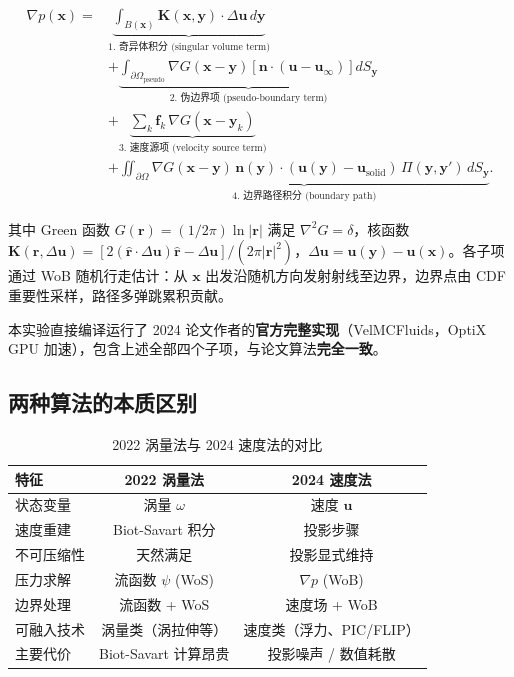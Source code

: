 \documentclass[12pt,a4paper]{article}
\begin{document}
\begin{align}
\nabla p(\boldsymbol{x}) = &\underbrace{\int_{B(\boldsymbol{x})} \boldsymbol{K}(\boldsymbol{x},\boldsymbol{y})\cdot\Delta\boldsymbol{u}\,d\boldsymbol{y}}_{\text{1. 奇异体积分 (singular volume term)}} \nonumber \\
&+ \underbrace{\int_{\partial\Omega_{\text{pseudo}}} \nabla G(\boldsymbol{x}-\boldsymbol{y})\left[\boldsymbol{n}\cdot(\boldsymbol{u}-\boldsymbol{u}_\infty)\right] dS_{\boldsymbol{y}}}_{\text{2. 伪边界项 (pseudo-boundary term)}} \nonumber \\
&+ \underbrace{\sum_k \boldsymbol{f}_k\,\nabla G(\boldsymbol{x}-\boldsymbol{y}_k)}_{\text{3. 速度源项 (velocity source term)}} \nonumber \\
&+ \underbrace{\iint_{\partial\Omega} \nabla G(\boldsymbol{x}-\boldsymbol{y})\, \boldsymbol{n}(\boldsymbol{y})\cdot(\boldsymbol{u}(\boldsymbol{y})-\boldsymbol{u}_{\text{solid}})\,\Pi(\boldsymbol{y},\boldsymbol{y}')\,dS_{\boldsymbol{y}}}_{\text{4. 边界路径积分 (boundary path)}}.
\label{eq:wob_terms}
\end{align}

其中 Green 函数 $G(\boldsymbol{r}) = (1/2\pi)\ln|\boldsymbol{r}|$ 满足 $\nabla^2 G = \delta$，核函数 $\boldsymbol{K}(\boldsymbol{r},\Delta\boldsymbol{u}) = [2(\hat{\boldsymbol{r}}\cdot\Delta\boldsymbol{u})\hat{\boldsymbol{r}} - \Delta\boldsymbol{u}]/(2\pi|\boldsymbol{r}|^2)$，$\Delta\boldsymbol{u} = \boldsymbol{u}(\boldsymbol{y})-\boldsymbol{u}(\boldsymbol{x})$。各子项通过 WoB 随机行走估计：从 $\boldsymbol{x}$ 出发沿随机方向发射射线至边界，边界点由 CDF 重要性采样，路径多弹跳累积贡献。

本实验直接编译运行了 2024 论文作者的\textbf{官方完整实现}（VelMCFluids，OptiX GPU 加速），包含上述全部四个子项，与论文算法\textbf{完全一致}。

\subsection{两种算法的本质区别}

\begin{table}[H]
    \centering
    \caption{2022 涡量法与 2024 速度法的对比}
    \label{tab:algorithm_diff}
    \begin{tabular}{lcc}
        \toprule
        \textbf{特征} & \textbf{2022 涡量法} & \textbf{2024 速度法} \\
        \midrule
        状态变量 & 涡量 $\omega$ & 速度 $\boldsymbol{u}$ \\
        速度重建 & Biot-Savart 积分 & 投影步骤 \\
        不可压缩性 & 天然满足 & 投影显式维持 \\
        压力求解 & 流函数 $\psi$ (WoS) & $\nabla p$ (WoB) \\
        边界处理 & 流函数 + WoS & 速度场 + WoB \\
        可融入技术 & 涡量类（涡拉伸等） & 速度类（浮力、PIC/FLIP） \\
        主要代价 & Biot-Savart 计算昂贵 & 投影噪声 / 数值耗散 \\
        \bottomrule
    \end{tabular}
\end{table}
\end{document}
